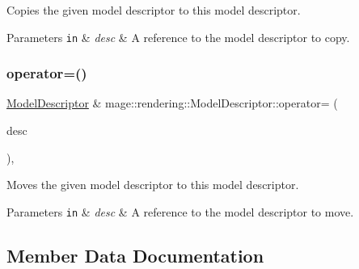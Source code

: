 Copies the given model descriptor to this model descriptor.


\begin{DoxyParams}[1]{Parameters}
\mbox{\tt in}  & {\em desc} & A reference to the model descriptor to copy. \\
\hline
\end{DoxyParams}
\mbox{\label{classmage_1_1rendering_1_1_model_descriptor_a52e9fbf292efc7a803d367bb3b6cb962}} 
\subsubsection{\texorpdfstring{operator=()}{operator=()}\hspace{0.1cm}{\footnotesize\ttfamily [2/2]}}
{\footnotesize\ttfamily \mbox{\hyperlink{classmage_1_1rendering_1_1_model_descriptor}{Model\+Descriptor}} \& mage\+::rendering\+::\+Model\+Descriptor\+::operator= (\begin{DoxyParamCaption}\item[{\mbox{\hyperlink{classmage_1_1rendering_1_1_model_descriptor}{Model\+Descriptor}} \&\&}]{desc }\end{DoxyParamCaption})\hspace{0.3cm}{\ttfamily [default]}, {\ttfamily [noexcept]}}

Moves the given model descriptor to this model descriptor.


\begin{DoxyParams}[1]{Parameters}
\mbox{\tt in}  & {\em desc} & A reference to the model descriptor to move. \\
\hline
\end{DoxyParams}


\subsection{Member Data Documentation}
\mbox{\label{classmage_1_1rendering_1_1_model_descriptor_ae88269763478f47e5d6c0086a4aeb33b}} 
